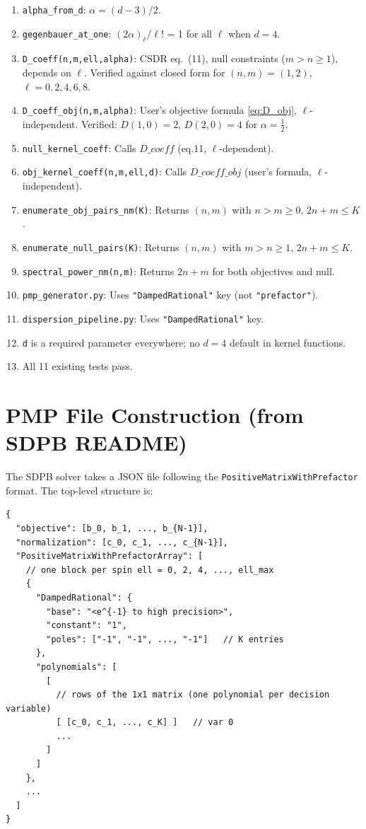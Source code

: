 \documentclass{article}
\begin{document}
\begin{enumerate}
  \item \texttt{alpha\_from\_d}: $\alpha=(d-3)/2$. \checkmark
  \item \texttt{gegenbauer\_at\_one}: $(2\alpha)_\ell/\ell!$ = 1 for all $\ell$ when $d=4$. \checkmark
  \item \texttt{D\_coeff(n,m,ell,alpha)}: CSDR eq.~(11), null constraints ($m>n\ge1$), depends on $\ell$.
        Verified against closed form for $(n,m)=(1,2)$, $\ell=0,2,4,6,8$. \checkmark
  \item \texttt{D\_coeff\_obj(n,m,alpha)}: User's objective formula \eqref{eq:D_obj}, $\ell$-independent.
        Verified: $D(1,0)=2$, $D(2,0)=4$ for $\alpha=\tfrac{1}{2}$. \checkmark
  \item \texttt{null\_kernel\_coeff}: Calls $D\_coeff$ (eq.11, $\ell$-dependent). \checkmark
  \item \texttt{obj\_kernel\_coeff(n,m,ell,d)}: Calls $D\_coeff\_obj$ (user's formula, $\ell$-independent). \checkmark
  \item \texttt{enumerate\_obj\_pairs\_nm(K)}: Returns $(n,m)$ with $n>m\ge0$, $2n+m\le K$. \checkmark
  \item \texttt{enumerate\_null\_pairs(K)}: Returns $(n,m)$ with $m>n\ge1$, $2n+m\le K$. \checkmark
  \item \texttt{spectral\_power\_nm(n,m)}: Returns $2n+m$ for both objectives and null. \checkmark
  \item \texttt{pmp\_generator.py}: Uses \texttt{"DampedRational"} key (not \texttt{"prefactor"}). \checkmark
  \item \texttt{dispersion\_pipeline.py}: Uses \texttt{"DampedRational"} key. \checkmark
  \item \texttt{d} is a required parameter everywhere; no $d=4$ default in kernel functions. \checkmark
  \item All 11 existing tests pass. \checkmark
\end{enumerate}

\section{PMP File Construction (from SDPB README)}

The SDPB solver takes a JSON file following the \texttt{PositiveMatrixWithPrefactor}
format.  The top-level structure is:

\begin{verbatim}
{
  "objective": [b_0, b_1, ..., b_{N-1}],
  "normalization": [c_0, c_1, ..., c_{N-1}],
  "PositiveMatrixWithPrefactorArray": [
    // one block per spin ell = 0, 2, 4, ..., ell_max
    {
      "DampedRational": {
        "base": "<e^{-1} to high precision>",
        "constant": "1",
        "poles": ["-1", "-1", ..., "-1"]   // K entries
      },
      "polynomials": [
        [
          // rows of the 1x1 matrix (one polynomial per decision variable)
          [ [c_0, c_1, ..., c_K] ]   // var 0
          ...
        ]
      ]
    },
    ...
  ]
}
\end{verbatim}
\end{document}
